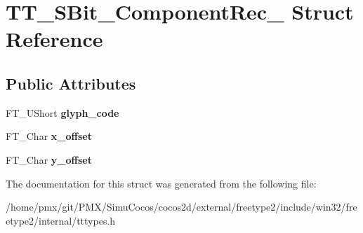 \hypertarget{structTT__SBit__ComponentRec__}{}\section{T\+T\+\_\+\+S\+Bit\+\_\+\+Component\+Rec\+\_\+ Struct Reference}
\label{structTT__SBit__ComponentRec__}
\subsection*{Public Attributes}
\begin{DoxyCompactItemize}
\item 
\mbox{\label{structTT__SBit__ComponentRec___a357eef9c05c65034b506cdd48271e562}} 
F\+T\+\_\+\+U\+Short {\bfseries glyph\+\_\+code}
\item 
\mbox{\label{structTT__SBit__ComponentRec___a97799704aa59bf737e274289fa70ca3f}} 
F\+T\+\_\+\+Char {\bfseries x\+\_\+offset}
\item 
\mbox{\label{structTT__SBit__ComponentRec___af24f91b7d5e0268a223514ad68a9a10b}} 
F\+T\+\_\+\+Char {\bfseries y\+\_\+offset}
\end{DoxyCompactItemize}


The documentation for this struct was generated from the following file\+:\begin{DoxyCompactItemize}
\item 
/home/pmx/git/\+P\+M\+X/\+Simu\+Cocos/cocos2d/external/freetype2/include/win32/freetype2/internal/tttypes.\+h\end{DoxyCompactItemize}
